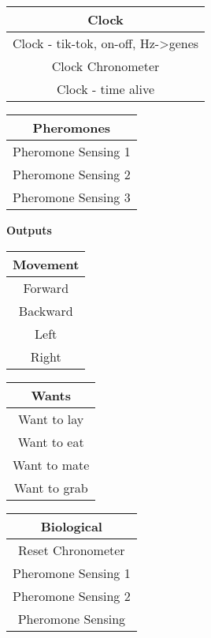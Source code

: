 \documentclass{article}
\begin{document}
\begin{center}
    \begin{tabular}{||c||}
        \hline
        Clock\\
        \hline \hline
        Clock - tik-tok, on-off, Hz->genes\\
        \hline
        Clock Chronometer\\
        \hline
        Clock - time alive\\
        \hline
    \end{tabular}
    \begin{tabular}{||c||}
        \hline
        Pheromones\\
        \hline\hline
        Pheromone Sensing 1\\
        \hline \hline
        Pheromone Sensing 2\\
        \hline
        Pheromone Sensing 3\\
        \hline
    \end{tabular}
\end{center}
\begin{center}
    \textbf{Outputs}
\end{center}
\begin{center}
    \begin{tabular}{||c||}
        \hline
        Movement\\
        \hline\hline
        Forward\\
        \hline
        Backward\\
        \hline
        Left\\
        \hline
        Right\\
        \hline
    \end{tabular}
    \begin{tabular}{||c||}
        \hline
        Wants\\
        \hline\hline
        Want to lay\\
        \hline
        Want to eat\\
        \hline
        Want to mate\\
        \hline
        Want to grab\\
        \hline
    \end{tabular}
    \begin{tabular}{||c||}
        \hline
        Biological\\
        \hline\hline
        Reset Chronometer\\
        \hline
        Pheromone Sensing 1\\
        \hline
        Pheromone Sensing 2\\
        \hline
        Pheromone Sensing\\
        \hline
    \end{tabular}
\end{center}
\end{document}

